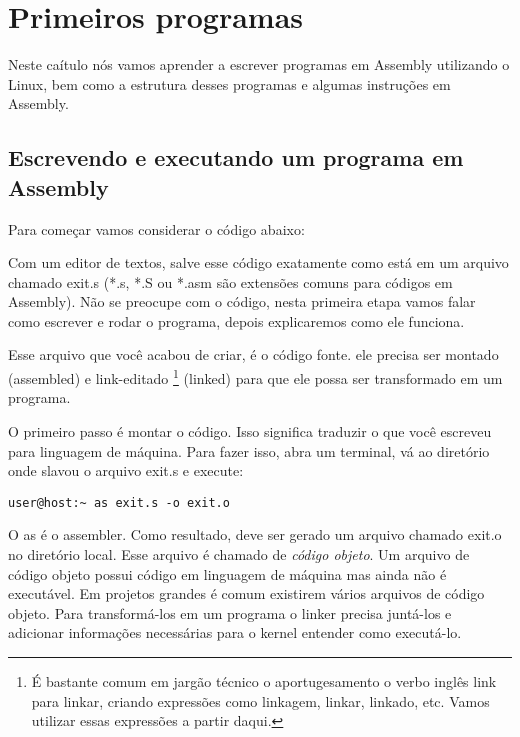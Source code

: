 \chapter{Primeiros programas}

Neste caítulo nós vamos aprender a escrever programas em Assembly utilizando o Linux, bem como a estrutura desses programas e algumas instruções em Assembly.

\section{Escrevendo e executando um programa em Assembly}

Para começar vamos considerar o código abaixo:

\begin{espacosimples}
Assembler}, caption={Primeiro programa em Assembly}]{src/ch03-01.s}
\end{espacosimples}

Com um editor de textos, salve esse código exatamente como está em um arquivo chamado exit.s (*.s, *.S ou *.asm são extensões comuns para códigos em Assembly). Não se preocupe com o código, nesta primeira etapa vamos falar como escrever e rodar o programa, depois explicaremos como ele funciona.

Esse arquivo que você acabou de criar, é o código fonte. ele precisa ser montado (assembled) e link-editado \footnote{É bastante comum em jargão técnico o aportugesamento o verbo inglês link para linkar, criando expressões como linkagem, linkar, linkado, etc. Vamos utilizar essas expressões a partir daqui.} (linked) para que ele possa ser transformado em um programa.

O primeiro passo é montar o código. Isso significa traduzir o que você escreveu para linguagem de máquina. Para fazer isso, abra um terminal, vá ao diretório onde slavou o arquivo exit.s e execute:

\begin{espacosimples}
\begin{verbatim}
user@host:~ as exit.s -o exit.o
\end{verbatim}
\end{espacosimples}

O as é o assembler. Como resultado, deve ser gerado um arquivo chamado exit.o no diretório local. Esse arquivo é chamado de \emph{código objeto}. Um arquivo de código objeto possui código em linguagem de máquina mas ainda não é executável. Em projetos grandes é comum existirem vários arquivos de código objeto. Para transformá-los em um programa o linker precisa juntá-los e adicionar informações necessárias para o kernel entender como executá-lo.

